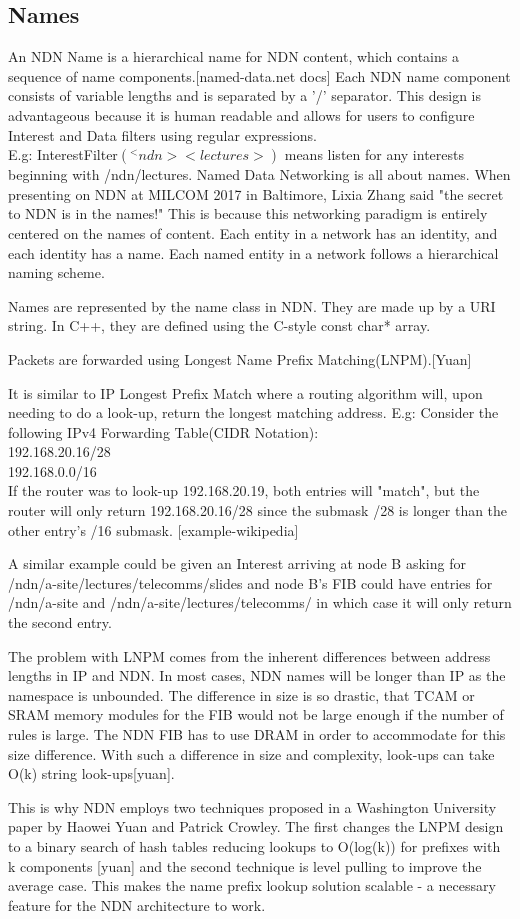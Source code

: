 \subsection{Names}
An NDN Name is a hierarchical name for NDN content, which contains a sequence of name components.[named-data.net docs] Each NDN name component  consists of variable lengths and is separated by a '/' separator. This design is advantageous because it is human readable and allows for users to configure Interest and Data filters using regular expressions. \\
E.g: InterestFilter$(^<ndn><lectures>)$ means listen for any interests beginning with /ndn/lectures. 
Named Data Networking is all about names. When presenting on NDN at MILCOM 2017 in Baltimore, Lixia Zhang said "the secret to NDN is in the names!" This is because this networking paradigm  is entirely centered on the names of content. Each entity in a network has an identity, and each identity has a name. Each named entity in a network follows a hierarchical naming scheme.\par
Names are represented by the name class in NDN. They are made up by a URI string. In C++, they are defined using the C-style const char* array. \par
Packets are forwarded using Longest Name Prefix Matching(LNPM).[Yuan] 

It is similar to IP Longest Prefix Match where a routing algorithm will, upon needing to do a look-up, return the longest matching address. E.g:
Consider the following IPv4 Forwarding Table(CIDR Notation):\\
192.168.20.16/28\\
192.168.0.0/16\\
If the router was to look-up 192.168.20.19, both entries will "match", but the router will only return 192.168.20.16/28 since the submask /28 is longer than the other entry's /16 submask. [example-wikipedia]

A similar example could be given an Interest arriving at node B asking for /ndn/a-site/lectures/telecomms/slides  and node B's FIB could have entries for /ndn/a-site and /ndn/a-site/lectures/telecomms/ in which case it will only return the second entry. \par 

The problem with LNPM comes from the inherent differences between address lengths in IP and NDN. In most cases, NDN names will be longer than IP as the namespace is unbounded. The difference in size is so drastic, that TCAM or SRAM memory modules for the FIB would not be large enough if the number of rules is large. The NDN FIB has to use DRAM in order to accommodate for this size difference. With such a difference in size and complexity, look-ups can take O(k) string look-ups[yuan].\par 
This is why NDN employs two techniques proposed in a Washington University paper by Haowei Yuan and Patrick Crowley. The first changes the LNPM design to a binary search of hash tables reducing lookups to O(log(k)) for prefixes with k components [yuan] and the second technique is level pulling to improve the average case. This makes the name prefix lookup solution scalable - a necessary feature for the NDN architecture to work. 

